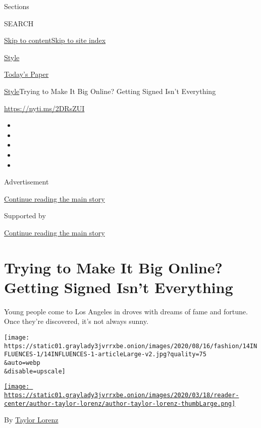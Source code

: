 Sections

SEARCH

\protect\hyperlink{site-content}{Skip to
content}\protect\hyperlink{site-index}{Skip to site index}

\href{https://www.nytimes3xbfgragh.onion/section/style}{Style}

\href{https://myaccount.nytimes3xbfgragh.onion/auth/login?response_type=cookie\&client_id=vi}{}

\href{https://www.nytimes3xbfgragh.onion/section/todayspaper}{Today's
Paper}

\href{/section/style}{Style}\textbar{}Trying to Make It Big Online?
Getting Signed Isn't Everything

\url{https://nyti.ms/2DRsZUI}

\begin{itemize}
\item
\item
\item
\item
\item
\end{itemize}

Advertisement

\protect\hyperlink{after-top}{Continue reading the main story}

Supported by

\protect\hyperlink{after-sponsor}{Continue reading the main story}

\hypertarget{trying-to-make-it-big-online-getting-signed-isnt-everything}{%
\section{Trying to Make It Big Online? Getting Signed Isn't
Everything}\label{trying-to-make-it-big-online-getting-signed-isnt-everything}}

Young people come to Los Angeles in droves with dreams of fame and
fortune. Once they're discovered, it's not always sunny.

\texttt{[image: https://static01.graylady3jvrrxbe.onion/images/2020/08/16/fashion/14INFLUENCES-1/14INFLUENCES-1-articleLarge-v2.jpg?quality=75\\\&auto=webp\\\&disable=upscale]}

\href{https://www.nytimes3xbfgragh.onion/by/taylor-lorenz}{\texttt{[image: https://static01.graylady3jvrrxbe.onion/images/2020/03/18/reader-center/author-taylor-lorenz/author-taylor-lorenz-thumbLarge.png]}}

By \href{https://www.nytimes3xbfgragh.onion/by/taylor-lorenz}{Taylor
Lorenz}

